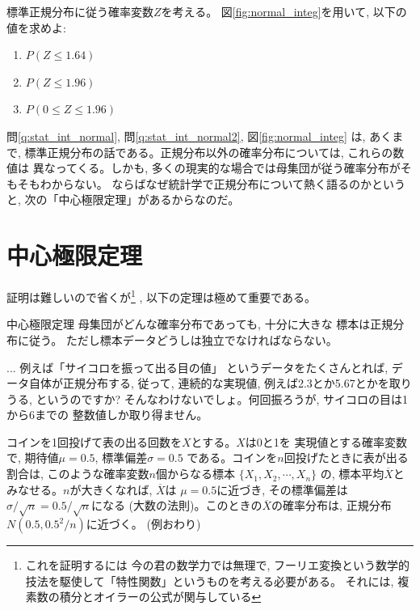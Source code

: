 \begin{q}\label{q:stat_int_normal2} 標準正規分布に従う確率変数$Z$を考える。
図\ref{fig:normal_integ}を用いて, 以下の値を求めよ:
\begin{enumerate}
\item $P(Z \leq 1.64)$
\item $P(Z \leq 1.96)$
\item $P(0\leq Z\leq 1.96)$
\end{enumerate}
\end{q}
\mv

問\ref{q:stat_int_normal}, 問\ref{q:stat_int_normal2}, 図\ref{fig:normal_integ}
は, あくまで, 標準正規分布の話である。正規分布以外の確率分布については, これらの数値は
異なってくる。しかも, 多くの現実的な場合では母集団が従う確率分布がそもそもわからない。
ならばなぜ統計学で正規分布について熱く語るのかというと, 次の「中心極限定理」があるからなのだ。
\vv


\section{中心極限定理}

証明は難しいので省くが\footnote{これを証明するには
今の君の数学力では無理で, フーリエ変換という数学的
技法を駆使して「特性関数」というものを考える必要がある。
それには, 複素数の積分とオイラーの公式が関与している}
, 以下の定理は極めて重要である。

\begin{itembox}{中心極限定理}
母集団がどんな確率分布であっても, 十分に大きな
標本は正規分布に従う。
ただし標本データどうしは独立でなければならない。
\end{itembox}

\begin{freqmiss}{\small{} ... 例えば「サイコロを振って出る目の値」
というデータをたくさんとれば, データ自体が正規分布する, 従って, 
連続的な実現値, 例えば2.3とか5.67とかを取りうる, というのですか? 
そんなわけないでしょ。何回振ろうが, サイコロの目は1から6までの
整数値しか取り得ません。}\end{freqmiss}
\mv

\begin{exmpl}\label{ex:cointoss_ntimes_CLT}
コインを1回投げて表の出る回数を$X$とする。$X$は0と1を
実現値とする確率変数で, 期待値$\mu=0.5$, 標準偏差$\sigma=0.5$
である。コインを$n$回投げたときに表が出る割合は, このような確率変数$n$個からなる標本
$\{X_1, X_2, \cdots, X_n\}$
の, 標本平均$\overline{X}$とみなせる。$n$が大きくなれば, $\overline{X}$は
$\mu=0.5$に近づき, その標準偏差は$\sigma/\sqrt{n}=0.5/\sqrt{n}$になる
(大数の法則)。このときの$\overline{X}$の確率分布は, 正規分布$N(0.5, 0.5^2/n)$に近づく。
(例おわり)\end{exmpl}
\mv

